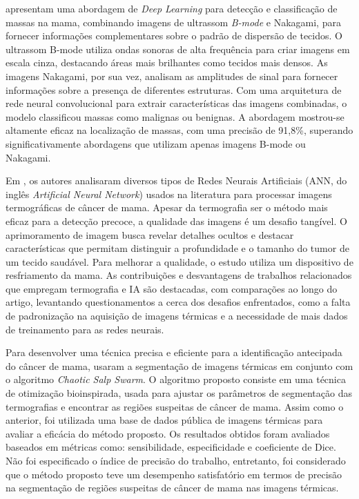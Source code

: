  apresentam uma abordagem de \textit{Deep Learning} para detecção e classificação de massas na mama, combinando imagens de ultrassom \textit{B-mode} e Nakagami, para fornecer informações complementares sobre o padrão de dispersão de tecidos. O ultrassom B-mode utiliza ondas sonoras de alta frequência para criar imagens em escala cinza, destacando áreas mais brilhantes como tecidos mais densos. As imagens Nakagami, por sua vez, analisam as amplitudes de sinal para fornecer informações sobre a presença de diferentes estruturas. Com uma arquitetura de rede neural convolucional para extrair características das imagens combinadas, o modelo classificou massas como malignas ou benignas. A abordagem mostrou-se altamente eficaz na localização de massas, com uma precisão de 91,8\%, superando significativamente abordagens que utilizam apenas imagens B-mode ou Nakagami.

Em , os autores analisaram diversos tipos de Redes Neurais Artificiais (ANN, do inglês \textit{Artificial Neural Network}) usados na literatura para processar imagens termográficas de câncer de mama. Apesar da termografia ser o método mais eficaz para a detecção precoce, a qualidade das imagens é um desafio tangível. O aprimoramento de imagem busca revelar detalhes ocultos e destacar características que permitam distinguir a profundidade e o tamanho do tumor de um tecido saudável. Para melhorar a qualidade, o estudo utiliza um dispositivo de resfriamento da mama. As contribuições e desvantagens de trabalhos relacionados que empregam termografia e IA são destacadas, com comparações ao longo do artigo, levantando questionamentos a cerca dos desafios enfrentados, como a falta de padronização na aquisição de imagens térmicas e a necessidade de mais dados de treinamento para as redes neurais. 

Para desenvolver uma técnica precisa e eficiente para a identificação antecipada do câncer de mama,  usaram a segmentação de imagens térmicas em conjunto com o algoritmo \textit{Chaotic Salp Swarm}. O algoritmo proposto consiste em uma técnica de otimização bioinspirada, usada para ajustar os parâmetros de segmentação das termografias e encontrar as regiões suspeitas de câncer de mama. Assim como o anterior, foi utilizada uma base de dados pública de imagens térmicas para avaliar a eficácia do método proposto. Os resultados obtidos foram avaliados baseados em métricas como: sensibilidade, especificidade e coeficiente de Dice. Não foi especificado o índice de precisão do trabalho, entretanto, foi considerado que o método proposto teve um desempenho satisfatório em termos de precisão na segmentação de regiões suspeitas de câncer de mama nas imagens térmicas.

